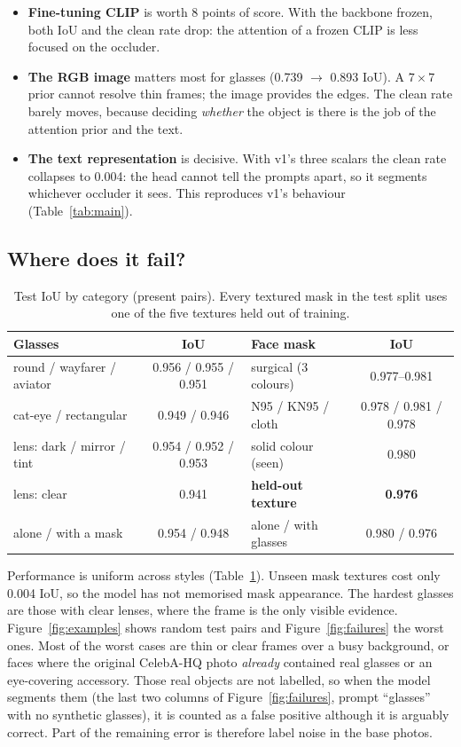 \documentclass[11pt,a4paper]{article}
\begin{document}
\begin{itemize}
  \item \textbf{Fine-tuning CLIP} is worth 8 points of score. With the backbone frozen, both IoU and the clean
  rate drop: the attention of a frozen CLIP is less focused on the occluder.
  \item \textbf{The RGB image} matters most for glasses (0.739 $\to$ 0.893 IoU). A $7\times7$ prior cannot
  resolve thin frames; the image provides the edges. The clean rate barely moves, because deciding
  \emph{whether} the object is there is the job of the attention prior and the text.
  \item \textbf{The text representation} is decisive. With v1's three scalars the clean rate collapses to
  0.004: the head cannot tell the prompts apart, so it segments whichever occluder it sees. This
  reproduces v1's behaviour (Table~\ref{tab:main}).
\end{itemize}

\subsection{Where does it fail?}
\begin{table}[h]
  \centering
  \caption{Test IoU by category (present pairs). Every textured mask in the test split uses one of
  the five textures held out of training.}
  \label{tab:breakdown}
  \small
  \begin{tabular}{lc@{\qquad}lc}
    \toprule
    Glasses & IoU & Face mask & IoU \\
    \midrule
    round / wayfarer / aviator & 0.956 / 0.955 / 0.951 & surgical (3 colours) & 0.977--0.981 \\
    cat-eye / rectangular & 0.949 / 0.946 & N95 / KN95 / cloth & 0.978 / 0.981 / 0.978 \\
    lens: dark / mirror / tint & 0.954 / 0.952 / 0.953 & solid colour (seen) & 0.980 \\
    lens: clear & 0.941 & \textbf{held-out texture} & \textbf{0.976} \\
    alone / with a mask & 0.954 / 0.948 & alone / with glasses & 0.980 / 0.976 \\
    \bottomrule
  \end{tabular}
\end{table}

Performance is uniform across styles (Table~\ref{tab:breakdown}). Unseen mask textures cost only
0.004 IoU, so the model has not memorised mask appearance. The hardest glasses are those with clear
lenses, where the frame is the only visible evidence. Figure~\ref{fig:examples} shows random test
pairs and Figure~\ref{fig:failures} the worst ones. Most of the worst cases are thin or clear frames
over a busy background, or faces where the original CelebA-HQ photo \emph{already} contained real
glasses or an eye-covering accessory. Those real objects are not labelled, so when the model segments
them (the last two columns of Figure~\ref{fig:failures}, prompt ``glasses'' with no synthetic glasses),
it is counted as a false positive although it is arguably correct. Part of the remaining error is
therefore label noise in the base photos.
\end{document}

